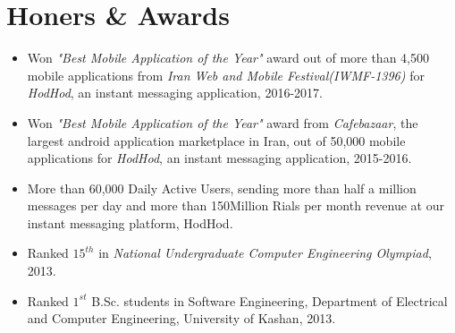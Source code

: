 \documentclass[10pt,a4paper,roman]{moderncv}        %
\begin{document}
\section{Honers \& Awards}
\begin{itemize} \itemsep \shortSpace
\item Won \textit{"Best Mobile Application of the Year"} award out of more than 4,500 mobile applications from \textit{Iran Web and Mobile Festival(IWMF-1396)} for \textit{HodHod}, an instant messaging application, 2016-2017.

\item Won \textit{"Best Mobile Application of the Year"} award from \textit{Cafebazaar}, the largest android application marketplace in Iran, out of 50,000 mobile applications for \textit{HodHod}, an instant messaging application, 2015-2016.

\item More than 60,000 Daily Active Users, sending more than half a million messages per day and more than 150Million Rials per month revenue at our instant messaging platform, HodHod.

\item Ranked $15^{th}$ in \textit{National Undergraduate Computer Engineering Olympiad}, 2013.

\item Ranked $1^{st}$ B.Sc. students in Software Engineering, Department of Electrical and Computer Engineering, University of Kashan, 2013.

\end{itemize}






\end{document}

